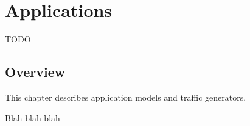 \chapter{Applications}
\label{cha:apps}


\ifdraft TODO
\section{Overview}

This chapter describes application models and traffic generators.

Blah blah blah
\fi



